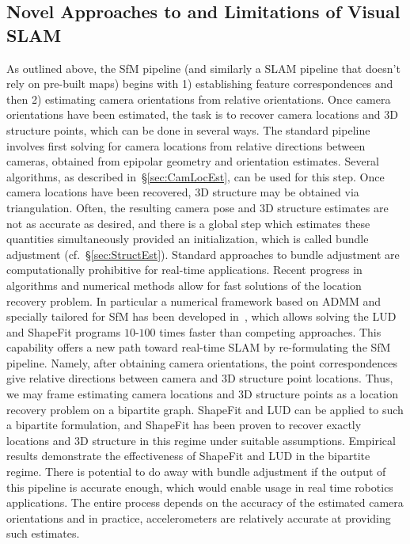\documentclass[10pt]{article}
\begin{document}
\subsection{Novel Approaches to and Limitations of Visual SLAM}
As outlined above, the SfM pipeline (and similarly a SLAM pipeline that doesn't rely on pre-built maps) begins with 1) establishing feature correspondences and then 2) estimating camera orientations from relative orientations. Once camera orientations have been estimated, the task is to recover camera locations and $3$D structure points, which can be done in several ways. The standard pipeline involves first solving for camera locations from relative directions between cameras, obtained from epipolar geometry and orientation estimates. Several algorithms, as described in~\S\ref{sec:CamLocEst}, can be used for this step. Once camera locations have been recovered, $3$D structure may be obtained via triangulation. Often, the resulting camera pose and $3$D structure estimates are not as accurate as desired, and there is a global step which estimates these quantities simultaneously provided an initialization, which is called bundle adjustment (cf.~\S\ref{sec:StructEst}). Standard approaches to bundle adjustment are computationally prohibitive for real-time applications. Recent progress in algorithms and numerical methods allow for fast solutions of the location recovery problem. In particular a numerical framework based on ADMM and specially tailored for SfM has been developed in~\cite{ShapeKick}, which allows solving the LUD and ShapeFit programs $10$-$100$ times faster than competing approaches. This capability offers a new path toward real-time SLAM by re-formulating the SfM pipeline. Namely, after obtaining camera orientations, the point correspondences give relative directions between camera and $3$D structure point locations. Thus, we may frame estimating camera locations and $3$D structure points as a location recovery problem on a bipartite graph. ShapeFit and LUD can be applied to such a bipartite formulation, and ShapeFit has been proven to recover exactly locations and $3$D structure in this regime under suitable assumptions. Empirical results demonstrate the effectiveness of ShapeFit and LUD in the bipartite regime. There is potential to do away with bundle adjustment if the output of this pipeline is accurate enough, which would enable usage in real time robotics applications. The entire process depends on the accuracy of the estimated camera orientations and in practice, accelerometers are relatively accurate at providing such estimates.
\end{document}
